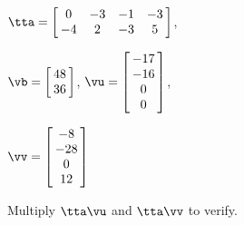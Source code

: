 {$\tta = \left[\hskip -3pt \begin{array}{cccc} 0 & -3 & -1 & -3 \\    -4 & 2 & -3 & 5 \end{array}\hskip -3pt \right] $, 

$\vb=\left[\hskip -3pt \begin{array}{c} 48\\   36 \end{array}\hskip -3pt \right] $, 
$\vu = \left[\hskip -3pt \begin{array}{c} -17 \\ -16 \\ 0 \\ 0 \end{array}\hskip -3pt \right]$, 

$\vv = \left[\hskip -3pt \begin{array}{c} -8\\ -28\\ 0 \\ 12 \end{array}\hskip -3pt \right] $}
{Multiply $\tta\vu$ and $\tta\vv$ to verify.}




